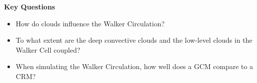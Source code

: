 \documentclass[11pt]{article}   	%
\begin{document}
%
%

\textbf{Key Questions}
\begin{itemize}
  \item{How do clouds influence the Walker Circulation?}
  \item{To what extent are the deep convective clouds and the low-level clouds in the Walker Cell coupled?}
  \item{When simulating the Walker Circulation, how well does a GCM compare to a CRM?}  
\end{itemize}
\end{document}
